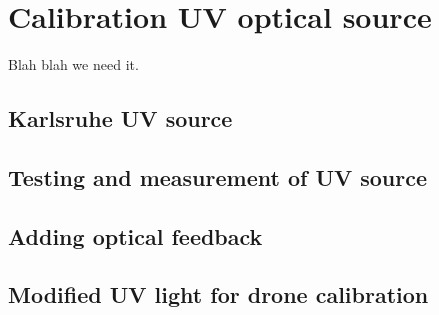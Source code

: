 
\chapter{Calibration UV optical source}
Blah blah we need it.
\section{Karlsruhe UV source}


\section{Testing and measurement of UV source}

\section{Adding optical feedback}


\section{Modified UV light for drone calibration 	}



